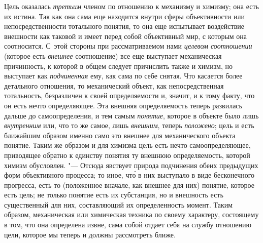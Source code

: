 {{Цель оказалась
{\em третьим} членом по
отношению к механизму и химизму; она есть их истина. Так как она сама еще
находится внутри сферы объективности или непосредственности тотального
понятия, то она еще испытывает воздействие внешности как таковой и имеет
перед собой объективный мир, с которым она соотносится. С~этой стороны при
рассматриваемом нами {\em целевом
соотношении} (которое есть
{\em внешнее}
соотношение) все еще выступает механическая причинность, к
которой в общем следует причислить также и химизм, но выступает как
{\em подчиненная} ему,
как сама по себе снятая. Что касается более детального отношения, то
механический объект, как непосредственная тотальность, безразличен к своей
определяемости и, значит, и к тому факту, что он есть нечто определяющее.
Эта внешняя определяемость теперь развилась дальше до самоопределения, и
тем самым {\em понятие},
которое в объекте было лишь
{\em внутренним} или, что
то же самое, лишь {\em внешним},
теперь {\em положено};
цель и есть ближайшим образом именно само это внешнее для
механического объекта понятие. Таким же образом и для химизма цель есть
нечто самоопределяющее, приводящее обратно к единству понятия ту внешнюю
определяемость, которой химизм обусловлен. "--- Отсюда явствует
природа подчинения обеих предыдущих форм объективного процесса; то иное, чт\'{о}
 в них выступало в виде бесконечного прогресса, есть то (положенное
вначале, как внешнее для них) понятие, которое есть цель; не только понятие
есть их субстанция, но и внешность есть существенный для них, составляющий
их определенность момент. Таким образом, механическая или
химическая техника по своему характеру, состоящему в том, что она
определена извне, сама собой отдает себя на службу отношению цели, которое
мы теперь и должны рассмотреть ближе.

}}
